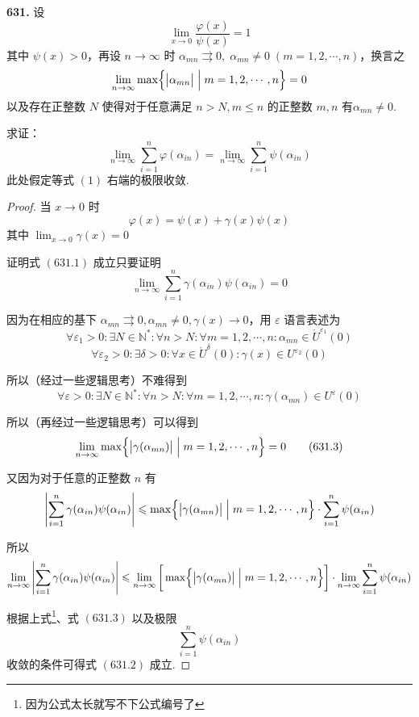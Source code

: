 \textbf{631.} 设
\[\lim_{x \rightarrow 0} \frac{\varphi(x)}{\psi(x)} = 1\]
其中 $\psi(x) > 0$，再设 $n \rightarrow \infty$ 时 $\alpha_{mn} \rightrightarrows 0,\; \alpha_{mn} \neq 0 \;(m = 1,2, \cdots, n)$，换言之
\[\lim_{n \rightarrow \infty} \max\Bigl\{ \bigl| \alpha_{mn}\bigr| \Bigm| m = 1,2,\cdots, n\Bigr\} = 0\]
以及存在正整数 $N$ 使得对于任意满足 $n > N, m \leqslant n$ 的正整数 $m,n$ 有$\alpha_{mn} \neq 0$.

求证：
\[\lim_{n \rightarrow \infty} \sum_{i=1}^{n} \varphi(\alpha_{in}) = \lim_{n \rightarrow \infty} \sum_{i=1}^{n} \psi(\alpha_{in}) \tag{631.1}\]
此处假定等式 $(1)$ 右端的极限收敛.

\begin{proof}
    当 $x \rightarrow 0$ 时
    \[\varphi(x) = \psi(x) + \gamma(x)\psi(x)\]
    其中 $\displaystyle \lim_{x \rightarrow 0} \gamma(x) = 0$

    证明式 $(631.1)$ 成立只要证明
    \[\lim_{n \rightarrow \infty} \sum_{i=1}^{n} \gamma(\alpha_{in})\psi(\alpha_{in}) = 0 \tag{631.2}\]

    因为在相应的基下 $\alpha_{mn} \rightrightarrows 0, \alpha_{mn} \neq 0, \gamma(x) \rightarrow 0$，用 $\varepsilon$ 语言表述为
    \[\forall \varepsilon_1 > 0: \exists N \in \mathbb{N}^*: \forall n > N: \forall m = 1,2,\cdots,n: \alpha_{mn} \in \mathring{U}^{\varepsilon_1}(0)\]
    \[\forall \varepsilon_2 > 0: \exists \delta > 0: \forall x \in \mathring{U}^\delta(0): \gamma(x) \in U^{\varepsilon_2}(0)\]

    所以（经过一些逻辑思考）不难得到
    \[\forall \varepsilon > 0: \exists N \in \mathbb{N}^*: \forall n > N: \forall m = 1,2,\cdots,n: \gamma(\alpha_{mn}) \in U^{\varepsilon}(0)\]

    所以（再经过一些逻辑思考）可以得到
    \[\lim_{n \rightarrow \infty} \max \Bigl\{ \bigl|\gamma(\alpha_{mn})\bigr| \Bigm| m=1,2,\cdots,n \Bigr\} = 0 \tag{631.3}\]

    又因为对于任意的正整数 $n$ 有
    \[\left|\sum_{i=1}^{n} \gamma(\alpha_{in})\psi(\alpha_{in})\right| \leqslant \max \Bigl\{ \bigl|\gamma(\alpha_{mn})\bigr| \Bigm| m=1,2,\cdots,n \Bigr\} \cdot \sum_{i=1}^{n} \psi(\alpha_{in})\]

    所以
    \[\lim_{n \rightarrow \infty} \left|\sum_{i=1}^{n} \gamma(\alpha_{in})\psi(\alpha_{in})\right| \leqslant \lim_{n \rightarrow \infty} \bigg[\max \Bigl\{ \bigl|\gamma(\alpha_{mn})\bigr| \Bigm| m=1,2,\cdots,n \Bigr\}\bigg] \cdot \lim_{n \rightarrow \infty} \sum_{i=1}^{n} \psi(\alpha_{in})\]

    根据上式\footnote{因为公式太长就写不下公式编号了}、式 $(631.3)$ 以及极限
    \[\sum_{i=1}^{n} \psi(\alpha_{in})\]
    收敛的条件可得式 $(631.2)$ 成立.
\end{proof}\vspace{9pt}

